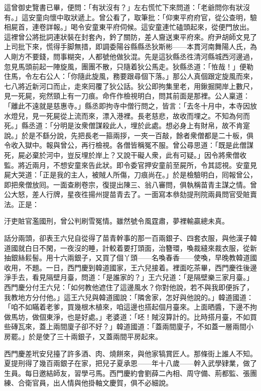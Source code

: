 這曾御史覽書已畢，便問：「有狀沒有？」左右慌忙下來問道：「老爺問你有狀沒有。」這安童向懷中取狀遞上。曾公看了，取筆批：「仰東平府府官，從公查明，驗相屍首，連卷詳報。」喝令安童東平府伺候。這安童連忙磕頭起來，從便門放出。這裡曾公將批詞連狀裝在封套內，鈐了關防，差人齎送東平府來。府尹胡師文見了上司批下來，慌得手脚無措，即調委陽谷縣縣丞狄斯彬——本貫河南舞陽人氏，為人剛方不要錢，問事糊突，人都號他做狄混。先是這狄縣丞徃清河縣城西河邊過，忽見馬頭前起一陣旋風，團團不散，只隨着狄公馬走。狄縣丞道：「恠哉！」便勒住馬，令左右公人：「你隨此旋風，務要跟尋個下落。」{}那公人真個跟定旋風而來，七八將近新河口而止，走來囘覆了狄公話。狄公即拘集里老，用鍬掘開岸上數尺，見一死屍，宛然頸上有一刀痕。命仵作檢視明白，問其前面是那裡。公人稟道：「離此不遠就是慈惠寺。」縣丞即拘寺中僧行問之，皆言：「去冬十月中，本寺因放水燈兒，見一死屍從上流而來，漂入港裡。長老慈悲，故收而埋之。不知為何而死。」縣丞道：「分明是汝衆僧謀殺此人，埋於此處。想必身上有財帛，故不肯寔說。」於是不繇分說，先把長老一箍兩拶，一夾一百敲，餘者衆僧都是二十板，{}俱令收入獄中。報與曾公，再行檢視。各僧皆稱冤不服。曾公尋思道：「既是此僧謀死，屍必棄於河中，豈反埋於岸上？又說干礙人衆，此有可疑。」因令將衆僧收監。將近兩月，不想安童來告此狀。即令委官押安童前至屍所，令其認視。安童見屍大哭道：「正是我的主人，被賊人所傷，刀痕尚在。」於是檢驗明白，囘報曾公，即把衆僧放囘。一面查刷卷宗，復提出陳三、翁八審問，俱執稱苗青主謀之情。曾公大怒，差人行牌，星夜徃揚州提苗青去了。一面寫本叅劾提刑院兩員問官受賍賣法。正是：

汙吏賍官濫國刑，曾公判刷雪冤情。雖然號令風霆肅，夢裡輸贏總未真。

話分兩頭，卻表王六兒自從得了苗青幹事的那一百兩銀子、四套衣服，與他漢子韓道國就白日不閑，一夜沒的睡，計較着要打頭面，治簪環，喚裁縫來裁衣服，從新抽銀絲鬏髻。用十六兩銀子，又買了個丫頭——名喚春香——使喚，早晚教韓道國收用，不題。{}一日，西門慶到韓道國家，王六兒接着。裡面吃茶畢，西門慶徃後邊淨手去，看見隔壁月臺，問道：「是誰家的？」王六兒道：「是隔壁樂三家月臺。」西門慶分付王六兒：「如何教他遮住了這邊風水？你對他說，若不與我即便拆了，我教地方分付他。」這王六兒與韓道國說：「隣舍家，怎好與他說的。」韓道國道：「咱不如瞞着老爹，買幾根木植來，咱這邊也搭起個月臺來。上面晒醬，下邊不拘做馬坊，做個東淨，也是好處。」老婆道：「呸！賊沒算計的。比時搭月臺，不如買些磚瓦來，蓋上兩間廈子卻不好？」韓道國道：「蓋兩間廈子，不如蓋一層兩間小房罷。」於是使了三十兩銀子，又蓋兩間平房起來。

西門慶差玳安兒擡了許多酒、肉、燒餅來，與他家犒賞匠人。那條街上誰人不知。夏提刑得了幾百兩銀子在家，把兒子夏承恩——年十八歲——幹入武學肄業，做了生員。{}每日邀結師友，習學弓馬。西門慶約會劉薛二內相、周守備、荊都監、張團練、合衛官員，出人情與他掛軸文慶賀，俱不必細說。

